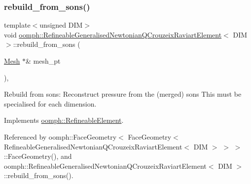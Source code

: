 \subsubsection{\texorpdfstring{rebuild\+\_\+from\+\_\+sons()}{rebuild\_from\_sons()}\hspace{0.1cm}{\footnotesize\ttfamily [1/3]}}
{\footnotesize\ttfamily template$<$unsigned D\+IM$>$ \\
void \hyperlink{classoomph_1_1RefineableGeneralisedNewtonianQCrouzeixRaviartElement}{oomph\+::\+Refineable\+Generalised\+Newtonian\+Q\+Crouzeix\+Raviart\+Element}$<$ D\+IM $>$\+::rebuild\+\_\+from\+\_\+sons (\begin{DoxyParamCaption}\item[{\hyperlink{classoomph_1_1Mesh}{Mesh} $\ast$\&}]{mesh\+\_\+pt }\end{DoxyParamCaption})\hspace{0.3cm}{\ttfamily [inline]}, {\ttfamily [virtual]}}



Rebuild from sons\+: Reconstruct pressure from the (merged) sons This must be specialised for each dimension. 



Implements \hyperlink{classoomph_1_1RefineableElement_a33324be27833fa4b78279d17158215fa}{oomph\+::\+Refineable\+Element}.



Referenced by oomph\+::\+Face\+Geometry$<$ Face\+Geometry$<$ Refineable\+Generalised\+Newtonian\+Q\+Crouzeix\+Raviart\+Element$<$ D\+I\+M $>$ $>$ $>$\+::\+Face\+Geometry(), and oomph\+::\+Refineable\+Generalised\+Newtonian\+Q\+Crouzeix\+Raviart\+Element$<$ D\+I\+M $>$\+::rebuild\+\_\+from\+\_\+sons().

\mbox{\label{classoomph_1_1RefineableGeneralisedNewtonianQCrouzeixRaviartElement_a526ff9b95eb0f7628e00cc72f901c32e}} 
